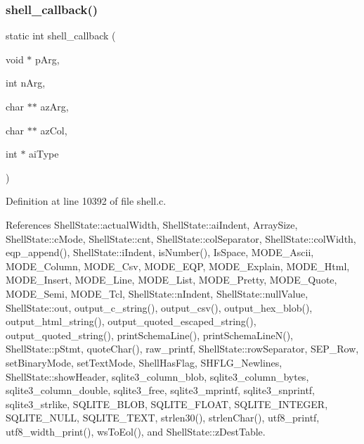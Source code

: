 \subsubsection{shell\+\_\+callback()}
{\footnotesize\ttfamily static int shell\+\_\+callback (\begin{DoxyParamCaption}\item[{void $\ast$}]{p\+Arg,  }\item[{int}]{n\+Arg,  }\item[{char $\ast$$\ast$}]{az\+Arg,  }\item[{char $\ast$$\ast$}]{az\+Col,  }\item[{int $\ast$}]{ai\+Type }\end{DoxyParamCaption})\hspace{0.3cm}{\ttfamily [static]}}



Definition at line 10392 of file shell.\+c.



References Shell\+State\+::actual\+Width, Shell\+State\+::ai\+Indent, Array\+Size, Shell\+State\+::c\+Mode, Shell\+State\+::cnt, Shell\+State\+::col\+Separator, Shell\+State\+::col\+Width, eqp\+\_\+append(), Shell\+State\+::i\+Indent, is\+Number(), Is\+Space, M\+O\+D\+E\+\_\+\+Ascii, M\+O\+D\+E\+\_\+\+Column, M\+O\+D\+E\+\_\+\+Csv, M\+O\+D\+E\+\_\+\+E\+QP, M\+O\+D\+E\+\_\+\+Explain, M\+O\+D\+E\+\_\+\+Html, M\+O\+D\+E\+\_\+\+Insert, M\+O\+D\+E\+\_\+\+Line, M\+O\+D\+E\+\_\+\+List, M\+O\+D\+E\+\_\+\+Pretty, M\+O\+D\+E\+\_\+\+Quote, M\+O\+D\+E\+\_\+\+Semi, M\+O\+D\+E\+\_\+\+Tcl, Shell\+State\+::n\+Indent, Shell\+State\+::null\+Value, Shell\+State\+::out, output\+\_\+c\+\_\+string(), output\+\_\+csv(), output\+\_\+hex\+\_\+blob(), output\+\_\+html\+\_\+string(), output\+\_\+quoted\+\_\+escaped\+\_\+string(), output\+\_\+quoted\+\_\+string(), print\+Schema\+Line(), print\+Schema\+Line\+N(), Shell\+State\+::p\+Stmt, quote\+Char(), raw\+\_\+printf, Shell\+State\+::row\+Separator, S\+E\+P\+\_\+\+Row, set\+Binary\+Mode, set\+Text\+Mode, Shell\+Has\+Flag, S\+H\+F\+L\+G\+\_\+\+Newlines, Shell\+State\+::show\+Header, sqlite3\+\_\+column\+\_\+blob, sqlite3\+\_\+column\+\_\+bytes, sqlite3\+\_\+column\+\_\+double, sqlite3\+\_\+free, sqlite3\+\_\+mprintf, sqlite3\+\_\+snprintf, sqlite3\+\_\+strlike, S\+Q\+L\+I\+T\+E\+\_\+\+B\+L\+OB, S\+Q\+L\+I\+T\+E\+\_\+\+F\+L\+O\+AT, S\+Q\+L\+I\+T\+E\+\_\+\+I\+N\+T\+E\+G\+ER, S\+Q\+L\+I\+T\+E\+\_\+\+N\+U\+LL, S\+Q\+L\+I\+T\+E\+\_\+\+T\+E\+XT, strlen30(), strlen\+Char(), utf8\+\_\+printf, utf8\+\_\+width\+\_\+print(), ws\+To\+Eol(), and Shell\+State\+::z\+Dest\+Table.



